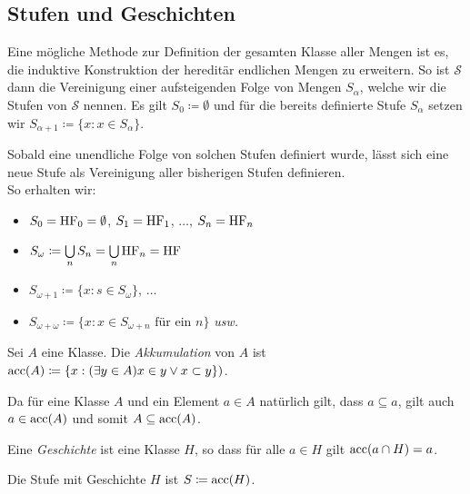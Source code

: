 \subsection{Stufen und Geschichten}

Eine mögliche Methode zur Definition der gesamten Klasse aller Mengen ist es, die induktive Konstruktion der hereditär endlichen Mengen zu erweitern. So ist $\mathcal{S}$ dann die Vereinigung einer aufsteigenden Folge von Mengen $S_\alpha$, welche wir die Stufen von $\mathcal{S}$ nennen. Es gilt $S_0\coloneqq \emptyset$ und für die bereits definierte Stufe $S_\alpha$ setzen wir $S_{\alpha +1}\coloneqq\{x : x\in S_\alpha\}$.

Sobald eine unendliche Folge von solchen Stufen definiert wurde, lässt sich eine neue Stufe als Vereinigung aller bisherigen Stufen definieren.\\

So erhalten wir:
\begin{itemize}
	\item $S_0=\operatorname{HF}_0=\emptyset$, $S_1=\operatorname{HF}_1$, $\dots$, $S_n=\operatorname{HF}_n$
	\item $S_\omega \coloneqq \bigcup\limits_n S_n = \bigcup\limits_n \operatorname{HF}_n = \operatorname{HF}$
	\item $S_{\omega+1}\coloneqq\{x : s\in S_\omega\}$, $\dots$
	\item $S_{\omega+\omega}\coloneqq\{x : x \in S_{\omega+n} \text{ für ein } n\}$ \textit{usw.}
\end{itemize}

\begin{definition}
	Sei $A$ eine Klasse. Die \textit{Akkumulation} von $A$ ist $\operatorname{acc}(A)\coloneqq\{x : (\exists y \in A) x\in y\lor x \subset y\})$.
\end{definition}

Da für eine Klasse $A$ und ein Element $a\in A$ natürlich gilt, dass $a \subseteq a$, gilt auch $a\in \operatorname{acc}(A)$ und somit $A\subseteq \operatorname{acc}(A)$.

\begin{definition}[Geschichten]
	Eine \textit{Geschichte} ist eine Klasse $H$, so dass für alle $a\in H$ gilt $\operatorname{acc}(a\cap H)=a$.
\end{definition}

Die Stufe mit Geschichte $H$ ist $S\coloneqq \operatorname{acc}(H)$.

